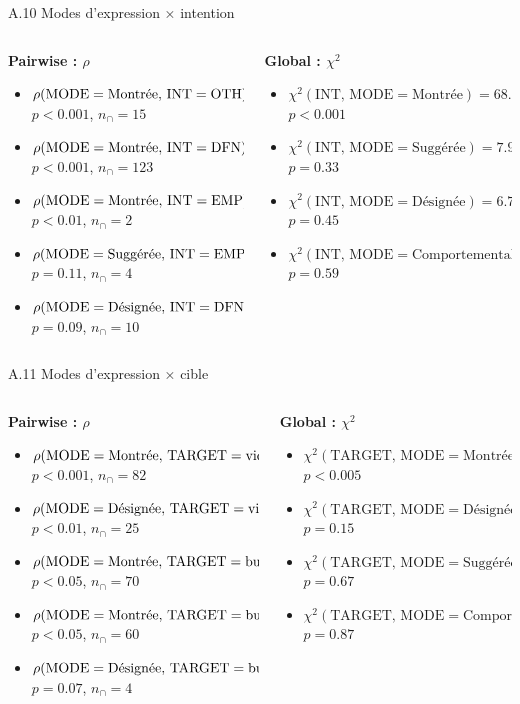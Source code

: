 \documentclass[aspectratio=169,10pt,xcolor=table]{beamer}
\newcommand{\pval}[1]{\ensuremath{#1}}
\newcommand{\pos}[1]{\textcolor{Positive}{#1}}
\newcommand{\negcorr}[1]{\textcolor{Negative}{#1}}
\newcommand{\rhoitem}[7]{\item \(\rho(\mathrm{#1}=\text{#2},\,\mathrm{#3}=\text{#4}) = #5\)\\[-0.15em]{\tiny \(p\pval{#6}\), \(n_{\cap}=#7\)}}
\newcommand{\chiitem}[5]{\item \(\chi^2(\mathrm{#1},\,\mathrm{#2}=\text{#3}) = #4\)\\[-0.15em]{\tiny \(p\pval{#5}\)}}
\begin{document}
\begin{frame}{A.10 Modes d'expression × intention}
\scriptsize
\begin{columns}[T,onlytextwidth]
\begin{column}{0.49\textwidth}
\textbf{Pairwise : \(\rho\)}
\begin{itemize}
\setlength\itemsep{0.55em}
\rhoitem{MODE}{Montrée}{INT}{OTH}{\negcorr{-0.21}}{<0.001}{15}
\rhoitem{MODE}{Montrée}{INT}{DFN}{\pos{0.21}}{<0.001}{123}
\rhoitem{MODE}{Montrée}{INT}{EMP}{\negcorr{-0.11}}{<0.01}{2}
\rhoitem{MODE}{Suggérée}{INT}{EMP}{\pos{0.07}}{=0.11}{4}
\rhoitem{MODE}{Désignée}{INT}{DFN}{\negcorr{-0.07}}{=0.09}{10}
\end{itemize}
\end{column}
\begin{column}{0.49\textwidth}
\textbf{Global : \(\chi^2\)}
\begin{itemize}
\setlength\itemsep{0.55em}
\chiitem{INT}{MODE}{Montrée}{68.60}{<0.001}
\chiitem{INT}{MODE}{Suggérée}{7.98}{=0.33}
\chiitem{INT}{MODE}{Désignée}{6.77}{=0.45}
\chiitem{INT}{MODE}{Comportementale}{5.54}{=0.59}
\end{itemize}
\end{column}
\end{columns}
\end{frame}

\begin{frame}{A.11 Modes d'expression × cible}
\scriptsize
\begin{columns}[T,onlytextwidth]
\begin{column}{0.49\textwidth}
\textbf{Pairwise : \(\rho\)}
\begin{itemize}
\setlength\itemsep{0.55em}
\rhoitem{MODE}{Montrée}{TARGET}{victim}{\negcorr{-0.17}}{<0.001}{82}
\rhoitem{MODE}{Désignée}{TARGET}{victim}{\pos{0.13}}{<0.01}{25}
\rhoitem{MODE}{Montrée}{TARGET}{bully}{\pos{0.11}}{<0.05}{70}
\rhoitem{MODE}{Montrée}{TARGET}{bully\_support}{\pos{0.11}}{<0.05}{60}
\rhoitem{MODE}{Désignée}{TARGET}{bully}{\negcorr{-0.09}}{=0.07}{4}
\end{itemize}
\end{column}
\begin{column}{0.49\textwidth}
\textbf{Global : \(\chi^2\)}
\begin{itemize}
\setlength\itemsep{0.55em}
\chiitem{TARGET}{MODE}{Montrée}{25.56}{<0.005}
\chiitem{TARGET}{MODE}{Désignée}{13.25}{=0.15}
\chiitem{TARGET}{MODE}{Suggérée}{6.66}{=0.67}
\chiitem{TARGET}{MODE}{Comportementale}{4.55}{=0.87}
\end{itemize}
\end{column}
\end{columns}
\end{frame}
\end{document}
